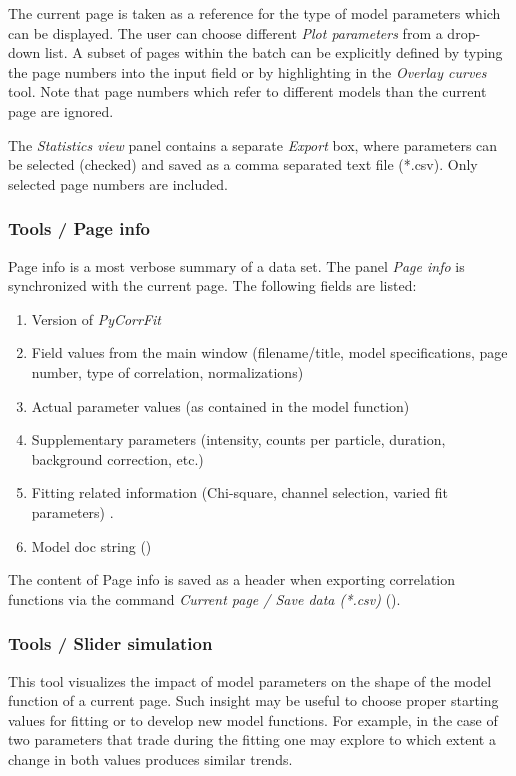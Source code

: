 The current page is taken as a reference for the type of model parameters which can be displayed. The user can choose different \textit{Plot parameters} from a drop-down list. A subset of pages within the batch can be explicitly defined by typing the page numbers into the input field or by highlighting in the \textit{Overlay curves} tool. Note that page numbers which refer to different models than the current page are ignored. 

The \textit{Statistics view} panel contains a separate \textit{Export} box, where parameters can be selected (checked) and saved as a comma separated text file (*.csv). Only selected page numbers are included.

\subsubsection{Tools / Page info}
\label{sec:menub.tools.pagei}
Page info is a most verbose summary of a data set. The panel \textit{Page info} is synchronized with the current page. The following fields are listed:


\begin{enumerate}
\item Version of \textit{PyCorrFit}
\item Field values from the main window (filename/title, model specifications, page number, type of correlation, normalizations)
\item Actual parameter values (as contained in the model function)
\item Supplementary parameters (intensity, counts per particle, duration, background correction, etc.)
\item Fitting related information (Chi-square, channel selection, varied fit parameters) .
\item Model doc string ()
\end{enumerate}
The content of Page info is saved as a header when exporting correlation functions via the command \textit{Current page / Save data (*.csv)} ().

\subsubsection{Tools / Slider simulation}
\label{sec:menub.tools.slide}
This tool visualizes the impact of model parameters on the shape of the model function of a current page. Such insight may be useful to choose proper starting values for fitting or to develop new model functions. For example, in the case of two parameters that trade during the fitting one may explore to which extent a change in both values produces similar trends.

